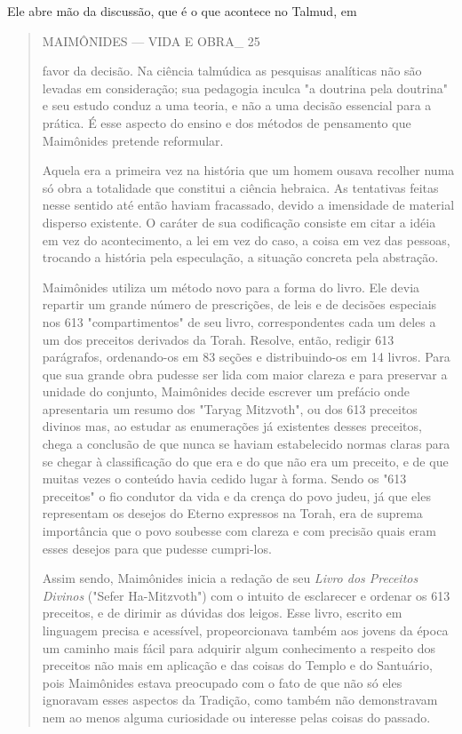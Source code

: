 Ele abre mão da discussão, que é o que acontece no Talmud, em

\begin{quote}
MAIMÔNIDES --- VIDA E OBRA\_ 25

favor da decisão. Na ciência talmúdica as pesquisas analíticas não são
levadas em consideração; sua pedagogia inculca "a doutrina pela
doutrina" e seu estu­do conduz a uma teoria, e não a uma decisão
essencial para a prática. É esse aspecto do ensino e dos métodos de
pensamento que Maimônides pretende reformular.

Aquela era a primeira vez na história que um homem ousava reco­lher numa
só obra a totalidade que constitui a ciência hebraica. As tentativas
feitas nesse sentido até então haviam fracassado, devido a imensidade de
mate­rial disperso existente. O caráter de sua codificação consiste em
citar a idéia em vez do acontecimento, a lei em vez do caso, a coisa em
vez das pessoas, trocando a história pela especulação, a situação
concreta pela abstração.

Maimônides utiliza um método novo para a forma do livro. Ele de­via
repartir um grande número de prescrições, de leis e de decisões
especiais nos 613 "compartimentos" de seu livro, correspondentes cada um
deles a um dos preceitos derivados da Torah. Resolve, então, redigir 613
parágrafos, orde­nando-os em 83 seções e distribuindo-os em 14 livros.
Para que sua grande obra pudesse ser lida com maior clareza e para
preservar a unidade do conjunto, Mai­mônides decide escrever um prefácio
onde apresentaria um resumo dos "Tar­yag Mitzvoth", ou dos 613 preceitos
divinos mas, ao estudar as enumerações já existentes desses preceitos,
chega a conclusão de que nunca se haviam esta­belecido normas claras
para se chegar à classificação do que era e do que não era um preceito,
e de que muitas vezes o conteúdo havia cedido lugar à forma. Sendo os
"613 preceitos" o fio condutor da vida e da crença do povo judeu, já que
eles representam os desejos do Eterno expressos na Torah, era de
supre­ma importância que o povo soubesse com clareza e com precisão
quais eram esses desejos para que pudesse cumpri-los.

Assim sendo, Maimônides inicia a redação de seu \emph{Livro dos
Precei­tos Divinos} ("Sefer Ha-Mitzvoth") com o intuito de esclarecer e
ordenar os 613 preceitos, e de dirimir as dúvidas dos leigos. Esse
livro, escrito em linguagem precisa e acessível, propeorcionava também
aos jovens da época um caminho mais fácil para adquirir algum
conhecimento a respeito dos preceitos não mais em aplicação e das coisas
do Templo e do Santuário, pois Maimônides estava preocupado com o fato
de que não só eles ignoravam esses aspectos da Tradi­ção, como também
não demonstravam nem ao menos alguma curiosidade ou interesse pelas
coisas do passado.


\end{quote}
